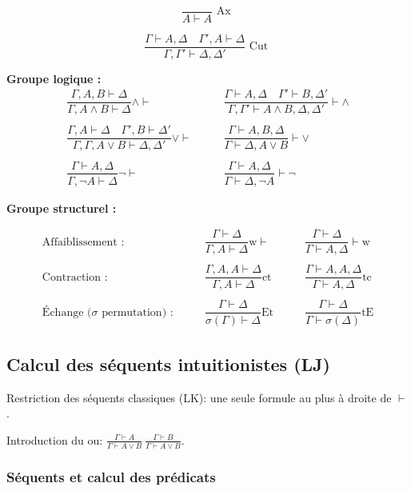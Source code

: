 \documentclass[french]{article}
\begin{document}
\[\dfrac{}{A \vdash A} \text{ Ax }\]

\[\dfrac{\Gamma \vdash A,\Delta \quad \Gamma',A \vdash \Delta}{\Gamma,\Gamma' \vdash \Delta, \Delta'} \text{ Cut }\]

\textbf{Groupe logique :}
\begin{align*}
\dfrac{\Gamma,A,B \vdash \Delta}{\Gamma, A \land B \vdash \Delta} \land \vdash &\qquad 
\dfrac{\Gamma \vdash A,\Delta \quad \Gamma' \vdash B,\Delta'}{\Gamma,\Gamma' \vdash A \land B, \Delta, \Delta'} \vdash \land \\ 
\\
\dfrac{\Gamma, A \vdash\Delta \quad \Gamma', B \vdash \Delta'}{\Gamma,\Gamma,  A \lor B \vdash \Delta, \Delta'} \lor \vdash    &\qquad 
\dfrac{\Gamma \vdash A, B, \Delta}{\Gamma \vdash \Delta, A \lor B} \vdash \lor\\
\\
\dfrac{\Gamma \vdash A, \Delta}{\Gamma, \neg A \vdash \Delta} \neg \vdash  &\qquad 
\dfrac{\Gamma \vdash A,\Delta}{\Gamma \vdash \Delta, \neg A} \vdash \neg
\end{align*}

\textbf{Groupe structurel :}

\begin{align*}
\text{Affaiblissement :} &\qquad \dfrac{\Gamma\vdash\Delta}{\Gamma, A\vdash\Delta}\text{w}\vdash &\qquad
\dfrac{\Gamma\vdash\Delta}{\Gamma\vdash A,\Delta}\vdash\text{w}\\
\\
\text{Contraction :} &\qquad\dfrac{\Gamma, A, A\vdash\Delta}{\Gamma, A\vdash\Delta}\text{ct} &\qquad
\dfrac{\Gamma\vdash A, A,\Delta}{\Gamma\vdash A,\Delta}\text{tc}\\
\\
\text{Échange ($\sigma$ permutation) :}&\qquad\dfrac{\Gamma\vdash\Delta}{\sigma (\Gamma)\vdash\Delta}\text{Et} &\qquad
\dfrac{\Gamma\vdash\Delta}{\Gamma\vdash\sigma (\Delta)}\text{tE}
\end{align*}


\subsection{Calcul des séquents intuitionistes (LJ)}
Restriction des séquents classiques (LK): une seule formule au plus à droite de $\vdash$.

Introduction du ou:
$\frac{\Gamma\vdash A}{\Gamma\vdash A\vee B}\ \frac{\Gamma\vdash B}{\Gamma\vdash A\vee B}$.


\subsubsection{Séquents et calcul des prédicats}

\end{document}
